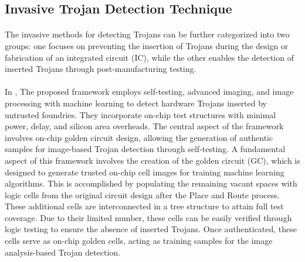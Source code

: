 \subsection{Invasive Trojan Detection Technique}
\paragraph*{}
The invasive methods for detecting Trojans can be further categorized into two groups: one focuses on preventing the insertion of Trojans during the design or fabrication of an integrated circuit (IC), while the other enables the detection of inserted Trojans through post-manufacturing testing.
\paragraph*{}
In \cite{9491099}, The proposed framework employs self-testing, advanced imaging, and image processing with machine learning to detect hardware Trojans inserted by untrusted foundries. They incorporate on-chip test structures with minimal power, delay, and silicon area overheads. The central aspect of the framework involves on-chip golden circuit design, allowing the generation of authentic samples for image-based Trojan detection through self-testing. A fundamental aspect of this framework involves the creation of the golden circuit (GC), which is designed to generate trusted on-chip cell images for training machine learning algorithms. This is accomplished by populating the remaining vacant spaces with logic cells from the original circuit design after the Place and Route process. These additional cells are interconnected in a tree structure to attain full test coverage. Due to their limited number, these cells can be easily verified through logic testing to ensure the absence of inserted Trojans. Once authenticated, these cells serve as on-chip golden cells, acting as training samples for the image analysis-based Trojan detection.
